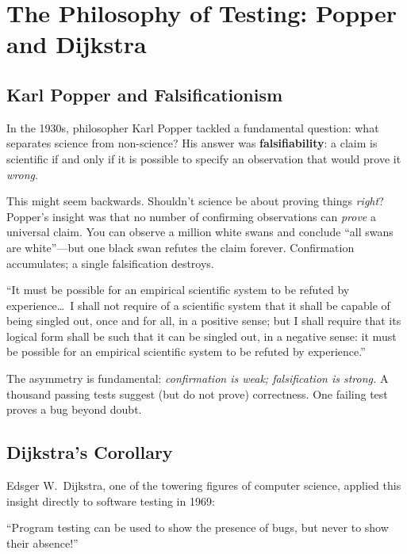 \documentclass[11pt,letterpaper]{article}
\newcommand{\keyterm}[1]{\textbf{\textcolor{cssecondary}{#1}}}
\begin{document}
\section{The Philosophy of Testing: Popper and Dijkstra}

\subsection{Karl Popper and Falsificationism}

In the 1930s, philosopher Karl Popper tackled a fundamental question: what separates science from non-science? His answer was \keyterm{falsifiability}: a claim is scientific if and only if it is possible to specify an observation that would prove it \textit{wrong}.

This might seem backwards. Shouldn't science be about proving things \textit{right}? Popper's insight was that no number of confirming observations can \textit{prove} a universal claim. You can observe a million white swans and conclude ``all swans are white''---but one black swan refutes the claim forever. Confirmation accumulates; a single falsification destroys.

\begin{quotebox}
``It must be possible for an empirical scientific system to be refuted by experience\ldots\ I shall not require of a scientific system that it shall be capable of being singled out, once and for all, in a positive sense; but I shall require that its logical form shall be such that it can be singled out, in a negative sense: it must be possible for an empirical scientific system to be refuted by experience.''
\end{quotebox}

The asymmetry is fundamental: \textit{confirmation is weak; falsification is strong.} A thousand passing tests suggest (but do not prove) correctness. One failing test proves a bug beyond doubt.

\subsection{Dijkstra's Corollary}

Edsger W.\ Dijkstra, one of the towering figures of computer science, applied this insight directly to software testing in 1969:

\begin{quotebox}
``Program testing can be used to show the presence of bugs, but never to show their absence!''
\end{quotebox}
\end{document}
